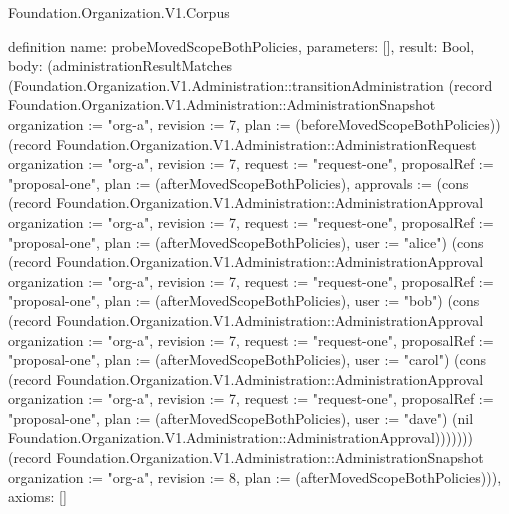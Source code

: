 \begin{lexlean}{Foundation.Organization.V1.Corpus}
\begin{semanticmodule}
definition{
  name: probeMovedScopeBothPolicies,
  parameters: [],
  result: Bool,
  body: (administrationResultMatches (Foundation.Organization.V1.Administration::transitionAdministration (record Foundation.Organization.V1.Administration::AdministrationSnapshot {organization := "org-a", revision := 7, plan := (beforeMovedScopeBothPolicies)}) (record Foundation.Organization.V1.Administration::AdministrationRequest {organization := "org-a", revision := 7, request := "request-one", proposalRef := "proposal-one", plan := (afterMovedScopeBothPolicies), approvals := (cons (record Foundation.Organization.V1.Administration::AdministrationApproval {organization := "org-a", revision := 7, request := "request-one", proposalRef := "proposal-one", plan := (afterMovedScopeBothPolicies), user := "alice"}) (cons (record Foundation.Organization.V1.Administration::AdministrationApproval {organization := "org-a", revision := 7, request := "request-one", proposalRef := "proposal-one", plan := (afterMovedScopeBothPolicies), user := "bob"}) (cons (record Foundation.Organization.V1.Administration::AdministrationApproval {organization := "org-a", revision := 7, request := "request-one", proposalRef := "proposal-one", plan := (afterMovedScopeBothPolicies), user := "carol"}) (cons (record Foundation.Organization.V1.Administration::AdministrationApproval {organization := "org-a", revision := 7, request := "request-one", proposalRef := "proposal-one", plan := (afterMovedScopeBothPolicies), user := "dave"}) (nil Foundation.Organization.V1.Administration::AdministrationApproval)))))})) (record Foundation.Organization.V1.Administration::AdministrationSnapshot {organization := "org-a", revision := 8, plan := (afterMovedScopeBothPolicies)})),
  axioms: []
}


\end{semanticmodule}
\end{lexlean}
